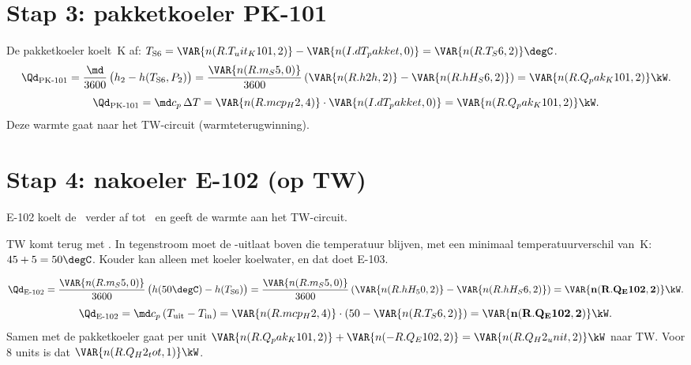 \section{Stap 3: pakketkoeler PK-101}
De pakketkoeler koelt \,K af: $T_\mathrm{S6} = \VAR{n(R.T_uit_K101,2)} - \VAR{n(I.dT_pakket,0)} = \VAR{n(R.T_S6,2)}\degC$.
\[
\Qd_{\text{PK-101}} = \frac{\md}{3600}\,\big(h_2 - h(T_\mathrm{S6},P_2)\big) = \frac{\VAR{n(R.m_S5,0)}}{3600}\,(\VAR{n(R.h2h,2)} - \VAR{n(R.hH_S6,2)}) = \VAR{n(R.Q_pak_K101,2)}\kW .
\]
\[
\Qd_{\text{PK-101}} = \md c_p\,\Delta T = \VAR{n(R.mcp_H2,4)}\cdot\VAR{n(I.dT_pakket,0)} = \VAR{n(R.Q_pak_K101,2)}\kW .
\]
Deze warmte gaat naar het TW-circuit (warmteterugwinning).

\section{Stap 4: nakoeler E-102 (op TW)}
E-102 koelt de \HH\ verder af tot \degC\ en geeft de warmte aan het TW-circuit.
\begin{waarom}[50\degC]
TW komt terug met \degC. In tegenstroom moet de \HH-uitlaat boven die temperatuur blijven, met
een minimaal temperatuurverschil van \,K: $45 + 5 = 50\degC$. Kouder kan alleen met koeler koelwater,
en dat doet E-103.
\end{waarom}
\[
\Qd_{\text{E-102}} = \frac{\VAR{n(R.m_S5,0)}}{3600}\,\big(h(50\degC) - h(T_\mathrm{S6})\big) = \frac{\VAR{n(R.m_S5,0)}}{3600}\,(\VAR{n(R.hH_50,2)} - \VAR{n(R.hH_S6,2)}) = \mathbf{\VAR{n(R.Q_E102,2)}\kW}.
\]
\[
\Qd_{\text{E-102}} = \md c_p\,(T_\mathrm{uit}-T_\mathrm{in}) = \VAR{n(R.mcp_H2,4)}\cdot(50 - \VAR{n(R.T_S6,2)}) = \mathbf{\VAR{n(R.Q_E102,2)}\kW}.
\]
Samen met de pakketkoeler gaat per unit $\VAR{n(R.Q_pak_K101,2)} + \VAR{n(-R.Q_E102,2)} = \VAR{n(R.Q_H2_unit,2)}\kW$
naar TW. Voor 8 units is dat $\VAR{n(R.Q_H2_tot,1)}\kW$.

